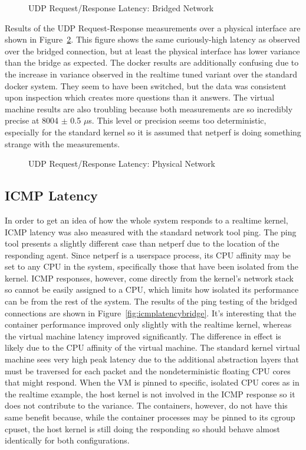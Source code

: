 \begin{figure}
    \centering
    \def\svgwidth{\columnwidth}
    
    \caption{UDP Request/Response Latency: Bridged Network}
    \label{fig:udp_rr_bridge}
\end{figure}
Results of the UDP Request-Response measurements over a physical interface are shown in Figure~\ref{fig:udp_rr_phys}.  
This figure shows the same curiously-high latency as observed over the bridged connection, but at least the physical interface has lower variance than the bridge as expected.
The docker results are additionally confusing due to the increase in variance observed in the realtime tuned variant over the standard docker system.
They seem to have been switched, but the data was consistent upon inspection which creates more questions than it answers.
The virtual machine results are also troubling because both measurements are so incredibly precise at 8004 $\pm$ 0.5 $\mu$s.  
This level or precision seems too deterministic, especially for the standard kernel so it is assumed that netperf is doing something strange with the measurements.

\begin{figure}
    \centering
    \def\svgwidth{\columnwidth}
    
    \caption{UDP Request/Response Latency: Physical Network}
    \label{fig:udp_rr_phys}
\end{figure}

\subsection{ICMP Latency} %
\label{sub:icmplatency}
In order to get an idea of how the whole system responds to a realtime kernel, ICMP latency was also measured with the standard network tool ping.  
The ping tool presents a slightly different case than netperf due to the location of the responding agent.  
Since netperf is a userspace process, its CPU affinity may be set to any CPU in the system, specifically those that have been isolated from the kernel.
ICMP responses, however, come directly from the kernel's network stack so cannot be easily assigned to a CPU, which limits how isolated its performance can be from the rest of the system.
The results of the ping testing of the bridged connections are shown in Figure~\ref{fig:icmplatencybridge}.
It's interesting that the container performance improved only slightly with the realtime kernel, whereas the virtual machine latency improved significantly.  
The difference in effect is likely due to the CPU affinity of the virtual machine.  
The standard kernel virtual machine sees very high peak latency due to the additional abstraction layers that must be traversed for each packet and the nondeterministic floating CPU cores that might respond.
When the VM is pinned to specific, isolated CPU cores as in the realtime example, the host kernel is not involved in the ICMP response so it does not contribute to the variance.
The containers, however, do not have this same benefit because, while the container processes may be pinned to its cgroup cpuset, the host kernel is still doing the responding so should behave almost identically for both configurations.

